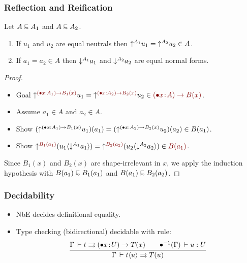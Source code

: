 \documentclass[t,fleqn]{beamer}
\makeatletter
\renewcommand{\ru}[2]{\dfrac{\begin{array}[b]{@{}c@{}} #1 \end{array}}{\begin{array}[t]{@{}l@{}} #2 \end{array}}}
\newcommand{\irr}{\mathord{\bullet}}
\renewcommand{\erhyp}[3][\irr]{#1#2 \of #3}
\renewcommand{\erfunT}[4][\irr]{(\erhyp[#1]{#2}{#3}) \to #4}
\newcommand{\serfunT}[4][\irr]{(#1#2 : #3) \to #4}
\renewcommand{\resurrect}[1]{\irr^{-1}(#1)}
\makeatother
\begin{document}
\begin{frame}%
  \frametitle{Reflection and Reification}
  \begin{theorem}
    Let $A \shape A_1$ and $A \shape A_2$.
    \begin{enumerate}
    \item If $u_1$ and $u_2$ are equal neutrals then $\mathord{\uparrow^{A_1}} u_1 = \mathord{\uparrow^{A_2}} u_2 \in A$.
    \item If $a_1 = a_2 \in A$ then $\mathord{\downarrow^{A_1}} a_1$ and $\mathord{\downarrow^{A_2}} a_2$ are equal normal forms.
    \end{enumerate}
  \end{theorem}
  \begin{proof}
    \begin{itemize}
    \item
    Goal $\up{\color{darkred}\serfunT x {A_1}{B_1(x)}} u_1 = \up{\color{darkred}\serfunT x {A_2}{B_2(x)}} u_2 \in \color{darkred}\erfunT x A {B(x)}$.
    \item
    Assume $a_1 \in A$ and $a_2 \in A$.
    \item
    Show $(\up{\serfunT x {A_1}{B_1(x)}} u_1)(a_1) = (\up{\serfunT x {A_2}{B_2(x)}} u_2)(a_2) \in B(a_1)$.
    \item
    Show $\up{\color{darkred}B_1(a_1)} (u_1 \ann {\down{A_1} a_1}) = \up{\color{darkred}B_2(a_2)} (u_2 \ann {\down{A_2}a_2}) \in \color{darkred}B(a_1)$.
    \end{itemize}
    Since $B_1(x)$ and $B_2(x)$ are shape-irrelevant in $x$, we apply the induction hypothesis with
    $B(a_1) \shape B_1(a_1)$ and $B(a_1) \shape B_2(a_2)$.
  \end{proof}
\end{frame}


\begin{frame}%
  \frametitle{Decidability}
  \begin{itemize}
  \item NbE decides definitional equality.
  \item Type checking (bidirectional) decidable with rule:
\[
  \ru{\Gamma \der t \jinf \erfunT x U T(x) \qquad
      \resurrect \Gamma \der u : U
    }{\Gamma \der t \ann u \jinf T(u)}
\]
  \end{itemize}
\end{frame}
\end{document}
